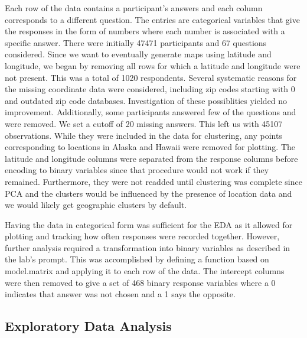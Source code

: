 \documentclass[english]{article}\usepackage{graphicx, color}
\numberwithin{equation}{section}
\numberwithin{figure}{section}
\begin{document}
Each row of the data contains a participant's answers and each column corresponds to a different question. The entries are categorical variables that give the responses in the form of numbers where each number is associated with a specific answer. There were initially 47471 participants and 67 questions considered. Since we want to eventually generate maps using latitude and longitude, we began by removing all rows for which a latitude and longitude were not present. This was a total of 1020 respondents. Several systematic reasons for the missing coordinate data were considered, including zip codes starting with 0 and outdated zip code databases. Investigation of these possiblities yielded no improvement. Additionally, some participants answered few of the questions and were removed. We set a cutoff of 20 missing answers. This left us with 45107 observations. While they were included in the data for clustering, any points corresponding to locations in Alaska and Hawaii were removed for plotting. The latitude and longitude columns were separated from the response columns before encoding to binary variables since that procedure would not work if they remained. Furthermore, they were not readded until clustering was complete since PCA and the clusters would be influenced by the presence of location data and we would likely get geographic clusters by default.

Having the data in categorical form was sufficient for the EDA as it allowed for plotting and tracking how often responses were recorded together. However, further analysis required a transformation into binary variables as described in the lab's prompt. This was accomplished by defining a function based on model.matrix and applying it to each row of the data. The intercept columns were then removed to give a set of 468 binary response variables where a 0 indicates that answer was not chosen and a 1 says the opposite. 


\subsection{Exploratory Data Analysis}
\end{document}
